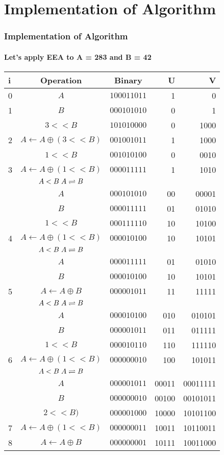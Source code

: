 \documentclass[12pt]{beamer}
\begin{document}
\section{Implementation of Algorithm}
\begin{frame}
	\frametitle{Implementation of Algorithm}
	\framesubtitle{Let's apply EEA to A = 283 and B = 42}
	\tiny 
	\begin{center}
		\begin{tabular}{| l | c | c | r | r |}
			\hline
			i & Operation & Binary & U & V \\ \hline
			0 & $A$ & $100011011$ & 1 & 0 \\ \hline 
			1 & $B$ & $000101010$ & 0 & 1 \\ \hline
			  & $3<<B$ & $101010000$ & 0 & 1000 \\ 
			2 & $A \leftarrow A \oplus (3<<B)$ & $001001011$ & 1 & 1000 \\ \hline
			 & $1<<B$ & $001010100$ & 0 & 0010 \\
			3 & $A \leftarrow A \oplus (1<<B)$ & $000011111$ & 1 & 1010 \\ \hline
			 & $A<B \hspace{1mm} A \rightleftharpoons B$ & & & \\
			 & $A$ & $000101010$ & 00 & 00001 \\
			 & $B$ & $000011111$ & 01 & 01010 \\
			 & $1<<B$ & $000111110$ & 10 & 10100 \\
			4 & $A \leftarrow A \oplus (1<<B)$ & $000010100$ & 10 & 10101 \\ \hline
			 & $A<B \hspace{1mm} A \rightleftharpoons B$ & & & \\
			 & $A$ & $000011111$ & 01 & 01010 \\
			 & $B$ & $000010100$ & 10 & 10101 \\
			5 & $A \leftarrow A \oplus B$ & $000001011$ & 11 & 11111 \\ \hline
			 & $A<B \hspace{1mm} A \rightleftharpoons B$ & & & \\
			 & $A$ & $000010100$ & 010 & 010101 \\
			 & $B$ & $000001011$ & 011 & 011111 \\
			 & $1<<B$ & $000010110$ & 110 & 111110 \\
			6 & $A \leftarrow A \oplus (1<<B)$ & $000000010$ & 100 &  101011 \\ \hline	
			 & $A<B \hspace{1mm} A \rightleftharpoons B$ & & & \\
			 & $A$ & $000001011$ & 00011 & 00011111 \\
			 & $B$ & $000000010$ & 00100 & 00101011 \\
			 & $2<<B)$ & $000001000$ & 10000 & 10101100 \\
			7 & $A \leftarrow A \oplus (1<<B)$ & $000000011$ & 10011 & 10110011 \\ \hline
			8 & $A \leftarrow A \oplus B$ & $000000001$ & 10111 & 10011000 \\ \hline		 
		\end{tabular}
	\end{center}
\end{frame}
\end{document}
